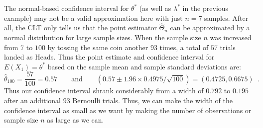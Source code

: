 \begin{rem}
The normal-based confidence interval for $\theta^*$ (as well as $\lambda^*$ in the previous example) may not be a valid approximation here with just $n=7$ samples.  After all, the CLT only tells us that the point estimator $\widehat{\Theta}_n$ can be approximated by a normal distribution for large sample sizes. 
When the sample size $n$ was increased from $7$ to $100$ by tossing the same coin another $93$ times, a total of $57$ trials landed as Heads.  Thus the point estimate and confidence interval for $E(X_1)=\theta^*$ based on the sample mean and sample standard deviations are:
\[
\widehat{\theta}_{100} = \frac{57}{100} = 0.57 \qquad \text{and} \qquad
 (0.57 \pm 1.96 \times 0.4975/\sqrt{100})
 =(0.4725, 0.6675) \enspace .
\]
Thus our confidence interval shrank considerably from a width of $0.792$ to $0.195$ after an additional $93$ Bernoulli trials.  Thus, we can make the width of the confidence interval as small as we want by making the number of observations or sample size $n$ as large as we can.
\end{rem}



